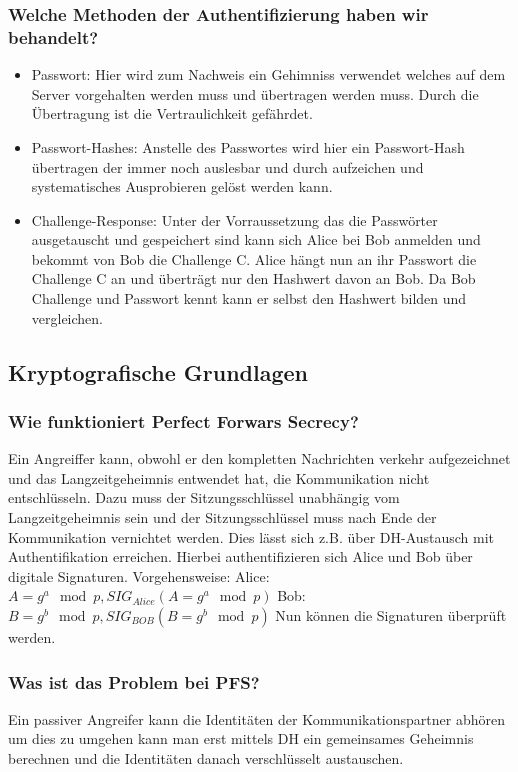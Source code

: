 	\subsubsection{Welche Methoden der Authentifizierung haben wir behandelt?}
	\begin{itemize}
		\item Passwort: Hier wird zum Nachweis ein Gehimniss verwendet welches auf dem Server vorgehalten werden muss und übertragen werden muss. Durch die Übertragung ist die Vertraulichkeit gefährdet. 
		\item Passwort-Hashes: Anstelle des Passwortes wird hier ein Passwort-Hash übertragen der immer noch auslesbar und durch aufzeichen und systematisches Ausprobieren gelöst werden kann.
		\item Challenge-Response: Unter der Vorraussetzung das die Passwörter ausgetauscht und gespeichert sind kann sich Alice bei Bob anmelden und bekommt von Bob die Challenge C. Alice hängt nun an ihr Passwort die Challenge C an und überträgt nur den Hashwert davon an Bob. Da Bob Challenge und Passwort kennt kann er selbst den Hashwert bilden und vergleichen.
	\end{itemize}

	\subsection{Kryptografische Grundlagen}
	
	\subsubsection{Wie funktioniert Perfect Forwars Secrecy?}
	Ein Angreiffer kann, obwohl er den kompletten Nachrichten verkehr aufgezeichnet und das Langzeitgeheimnis entwendet hat, die Kommunikation nicht entschlüsseln. Dazu muss der Sitzungsschlüssel unabhängig vom Langzeitgeheimnis sein und der Sitzungsschlüssel muss nach Ende der Kommunikation vernichtet werden.\newline
	Dies lässt sich z.B. über DH-Austausch mit Authentifikation erreichen. Hierbei authentifizieren sich Alice und Bob über digitale Signaturen.
	\newline
	Vorgehensweise: \newline
	Alice: $A=g^a \mod p,SIG_{Alice}(A=g^a \mod p)$ \newline
	Bob: $B=g^b \mod p, SIG_{BOB}(B=g^b \mod p)$	\newline
	Nun können die Signaturen überprüft werden.
	\subsubsection{Was ist das Problem bei PFS?}
	Ein passiver Angreifer kann die Identitäten der Kommunikationspartner abhören um dies zu umgehen kann man erst mittels DH ein gemeinsames Geheimnis berechnen und die Identitäten danach verschlüsselt austauschen.
